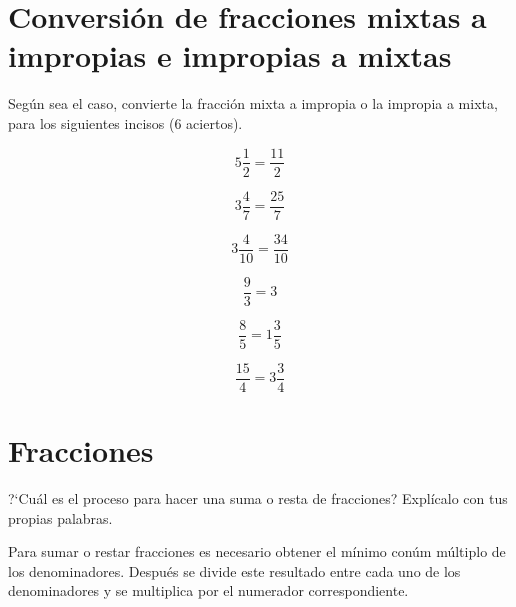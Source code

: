 \documentclass[11pt]{article}
\begin{document}
\vspace{2cm}

\section{Conversi\'on de fracciones mixtas a impropias e impropias a mixtas}
Seg\'un sea el caso, convierte la fracci\'on mixta a impropia o la impropia a
mixta, para los siguientes incisos (6 aciertos).

\begin{multicols}{3}
    \begin{equation*} 5\frac{1}{2}= \frac{11}{2} \end{equation*}

    \begin{equation*} 3\frac{4}{7}= \frac{25}{7} \end{equation*}

    \begin{equation*} 3\frac{4}{10}= \frac{34}{10} \end{equation*}

    \begin{equation*} \frac{9}{3}= 3  \end{equation*}

    \begin{equation*} \frac{8}{5}= 1\frac{3}{5}  \end{equation*}

    \begin{equation*} \frac{15}{4}= 3\frac{3}{4} \end{equation*}
\end{multicols}

\vspace{1cm}



\section{Fracciones}

?`Cu\'al es el proceso para hacer una suma o resta de fracciones? Expl\'icalo
con tus propias palabras.

\vspace{5mm}

Para sumar o restar fracciones es necesario obtener el m\'inimo con\'um
m\'ultiplo de los denominadores. Despu\'es se divide este resultado entre cada
uno de los denominadores y se multiplica por el numerador correspondiente.

\vspace{1.5cm}
\end{document}
